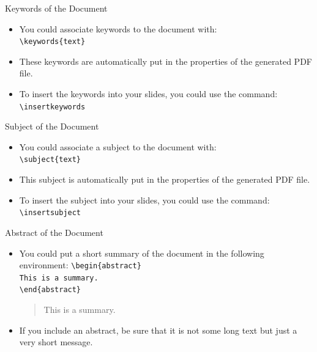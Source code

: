 \documentclass[english,sectioncirclenumberstyle]{ciadbeamer}
\begin{document}
\begin{frame}{Keywords of the Document}
	\begin{itemize}
	\item You could associate keywords to the document with: \\
		\texttt{{\textbackslash}keywords\{text\}}
	\vspace{1em}
	\item These keywords are automatically put in the properties of the generated PDF file.
	\vspace{1em}
	\item To insert the keywords into your slides, you could use the command: \\
			\texttt{{\textbackslash}insertkeywords}
	\end{itemize}
	\begin{example}
		\insertkeywords
	\end{example}
\end{frame}

\begin{frame}{Subject of the Document}
	\begin{itemize}
	\item You could associate a subject to the document with: \\
		\texttt{{\textbackslash}subject\{text\}}
	\vspace{1em}
	\item This subject is automatically put in the properties of the generated PDF file.
	\vspace{1em}
	\item To insert the subject into your slides, you could use the command: \\
			\texttt{{\textbackslash}insertsubject}
	\end{itemize}
	\begin{example}
		\insertsubject
	\end{example}
\end{frame}

\begin{frame}{Abstract of the Document}
	\begin{itemize}
	\item You could put a short summary of the document in the following environment:
		\texttt{{\textbackslash}begin\{abstract\}} \\
		\texttt{This is a summary.} \\
		\texttt{{\textbackslash}end\{abstract\}}
	\vspace{1em}
	\begin{abstract}
		This is a summary.
	\end{abstract}
	\item If you include an abstract, be sure that it is not some long text but just a very short message.
	\end{itemize}
\end{frame}
\end{document}

